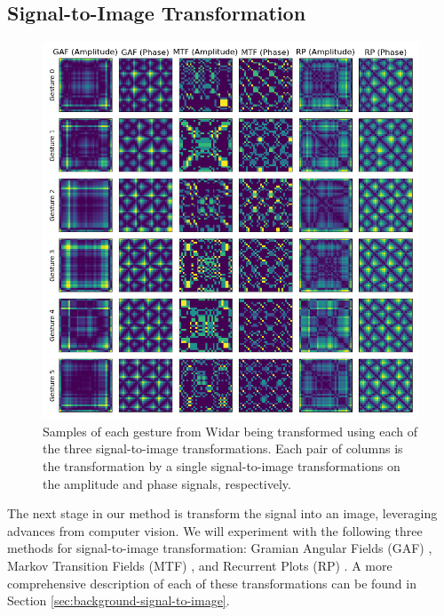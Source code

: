\subsection{Signal-to-Image Transformation}\label{sec:methodology-signal-to-image}
\begin{figure}
	\centering
	\includegraphics[width=\textwidth]{figures/transforms}
	\caption{Samples of each gesture from Widar being transformed using each of the three signal-to-image transformations. Each pair of columns is the transformation by a single signal-to-image transformations on the amplitude and phase signals, respectively.}
	\label{fig:transform-samples}
\end{figure}


The next stage in our method is transform the signal into an image, leveraging advances from computer vision.
We will experiment with the following three methods for signal-to-image transformation: Gramian Angular Fields (GAF) \cite{wang2015imaging}, Markov Transition Fields (MTF) \cite{wang2015imaging}, and Recurrent Plots (RP) \cite{eckmann1995recurrence}.
A more comprehensive description of each of these transformations can be found in Section \ref{sec:background-signal-to-image}.


